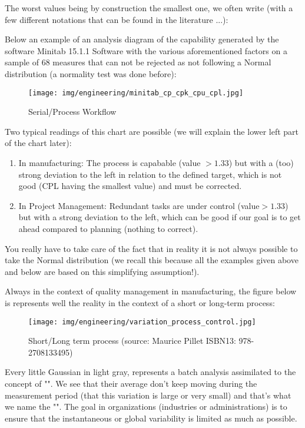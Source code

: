		The worst values being by construction the smallest one, we often write (with a few different notations that can be found in the literature ...):
		

Below an example of an analysis diagram of the capability generated by the software Minitab 15.1.1 Software with the various aforementioned factors on a sample of 68 measures that can not be rejected as not following a Normal distribution (a normality test was done before):

\begin{figure}[H]
\centering
\texttt{[image: img/engineering/minitab\_cp\_cpk\_cpu\_cpl.jpg]}
\caption{Serial/Process Workflow}
\end{figure}

Two typical readings of this chart are possible (we will explain the lower left part of the chart later):
	\begin{enumerate}
		\item In manufacturing: The process is capabable (value $>1.33$) but with a (too) strong deviation to the left in relation to the defined target, which is not good (CPL having the smallest value) and must be corrected.
		\item In Project Management: Redundant tasks are under control (value$>1.33$) but with a strong deviation to the left, which can be good if our goal is to get ahead compared to planning (nothing to correct).
	\end{enumerate}
	You really have to take care of the fact that in reality it is not always possible to take the Normal distribution (we recall this because all the examples given above and below are based on this simplifying assumption!).
	
	Always in the context of quality management in manufacturing, the figure below is represents well the reality in the context of a short or long-term process\label{short and long term process}:
	\begin{figure}[H]
		\centering
		\texttt{[image: img/engineering/variation\_process\_control.jpg]}
		\caption[Short/Long term process]{Short/Long term process (source: Maurice Pillet ISBN13: 978-2708133495)}
	\end{figure}
	Every little Gaussian in light gray, represents a batch analysis assimilated to the concept of "". We see that their average don't keep moving during the measurement period (that this variation is large or very small) and that's what we name the "". The goal in organizations (industries or administrations) is to ensure that the instantaneous or global variability is limited as much as possible.
	

